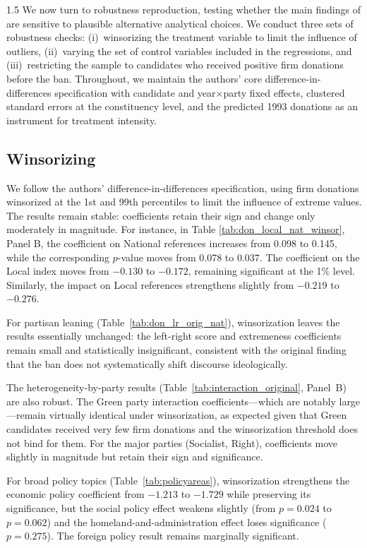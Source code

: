 \documentclass[12pt,a4paper]{article}
\begin{document}
\begin{spacing}{1.5}
We now turn to robustness reproduction, testing whether the main findings of \cite{Cage} are sensitive to plausible alternative analytical choices. We conduct three sets of robustness checks: (i)~winsorizing the treatment variable to limit the influence of outliers, (ii)~varying the set of control variables included in the regressions, and (iii)~restricting the sample to candidates who received positive firm donations before the ban. Throughout, we maintain the authors' core difference-in-differences specification with candidate and year$\times$party fixed effects, clustered standard errors at the constituency level, and the predicted 1993 donations as an instrument for treatment intensity.

\subsection{Winsorizing}
We follow the authors' difference-in-differences specification,
using firm donations winsorized at the 1st and 99th percentiles to limit the influence of extreme values. The results remain stable:
coefficients retain their sign and change only moderately in magnitude.
For instance, in Table \ref{tab:don_local_nat_winsor}, Panel B, the coefficient on National references increases from 0.098 to 0.145,
while the corresponding $p$-value moves from 0.078 to 0.037. The coefficient on the Local index moves from $-0.130$ to $-0.172$, remaining significant at the 1\% level. Similarly, the impact on Local references strengthens slightly from $-0.219$ to $-0.276$.

For partisan leaning (Table~\ref{tab:don_lr_orig_nat}), winsorization leaves the results essentially unchanged: the left-right score and extremeness coefficients remain small and statistically insignificant, consistent with the original finding that the ban does not systematically shift discourse ideologically.

The heterogeneity-by-party results (Table~\ref{tab:interaction_original}, Panel~B) are also robust. The Green party interaction coefficients---which are notably large---remain virtually identical under winsorization, as expected given that Green candidates received very few firm donations and the winsorization threshold does not bind for them. For the major parties (Socialist, Right), coefficients move slightly in magnitude but retain their sign and significance.

For broad policy topics (Table~\ref{tab:policyareas}), winsorization strengthens the economic policy coefficient from $-1.213$ to $-1.729$ while preserving its significance, but the social policy effect weakens slightly (from $p=0.024$ to $p=0.062$) and the homeland-and-administration effect loses significance ($p=0.275$). The foreign policy result remains marginally significant.


\end{spacing}
\end{document}
